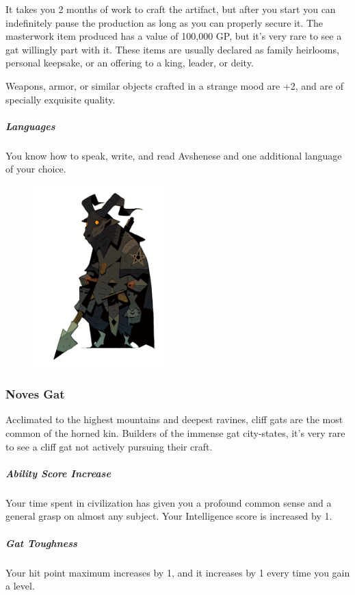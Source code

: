     It takes you 2 months of work to craft the artifact, but after you start you can indefinitely pause the production as long as you can properly secure it.
    The masterwork item produced has a value of 100,000 GP, but it's very rare to see a gat willingly part with it.
    These items are usually declared as family heirlooms, personal keepsake, or an offering to a king, leader, or deity.

    Weapons, armor, or similar objects crafted in a strange mood are +2, and are of specially exquisite quality.

    \subparagraph{Languages} You know how to speak, write, and read Avshenese and one additional language of your choice.

\begin{figure}[!b]
    \centering
    \includegraphics[width=0.47\textwidth]{04kins/img/11gat_knight.png}
\end{figure}

\newpage

\subsubsection{Noves Gat}
    Acclimated to the highest mountains and deepest ravines, cliff gats are the most common of the horned kin.
    Builders of the immense gat city-states, it's very rare to see a cliff gat not actively pursuing their craft.

    \subparagraph{Ability Score Increase} Your time spent in civilization has given you a profound common sense and a general grasp on almost any subject.
    Your Intelligence score is increased by 1.

    \subparagraph{Gat Toughness} Your hit point maximum increases by 1, and it increases by 1 every time you gain a level.

